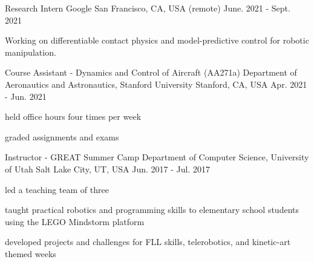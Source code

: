 

\begin{cventries}
	
\cventry
{Research Intern} %
{Google} %
{San Francisco, CA, USA (remote)} %
{June. 2021 - Sept. 2021} %
{
	\begin{cvitems} %
		\item{Working on differentiable contact physics and model-predictive control for robotic manipulation.}
	\end{cvitems}
}
	
\cventry
{Course Assistant - Dynamics and Control of Aircraft (AA271a)} %
{Department of Aeronautics and Astronautics, Stanford University} %
{Stanford, CA, USA} %
{Apr. 2021 - Jun. 2021} %
{
	\begin{cvitems} %
		\item{held office hours four times per week}
		\item{graded assignments and exams}
	\end{cvitems}
}

  \cventry
    {Instructor - GREAT Summer Camp} %
    {Department of Computer Science, University of Utah} %
    {Salt Lake City, UT, USA} %
    {Jun. 2017 - Jul. 2017} %
    {
      \begin{cvitems} %
        \item {led a teaching team of three}
        \item{taught practical robotics and programming skills to elementary school students using the LEGO Mindstorm platform}
        \item {developed projects and challenges for FLL skills, telerobotics, and kinetic-art themed weeks}
      \end{cvitems}
    }


\end{cventries}
